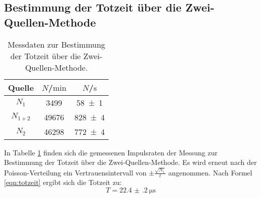 \subsection{Bestimmung der Totzeit über die Zwei-Quellen-Methode}
\begin{table}
  \centering
  \caption{Messdaten zur Bestimmung der Totzeit über die Zwei-Quellen-Methode.}
  \label{tab:tot}
\begin{tabular}{ccc}
  \toprule
Quelle& $N$/$\si{\minute}$& $N$/$\si{\second}$ \\
\midrule
$N_1$ & 3499 & \num{58(1)} \\
$N_{1+2}$ & 49676 & \num{828(4)} \\
$N_{2}$ & 46298 & \num{772(4)} \\
\bottomrule
\end{tabular}
\end{table}
In Tabelle \ref{tab:tot} finden sich die gemessenen Impulsraten der Messung zur Bestimmung der Totzeit über die Zwei-Quellen-Methode.
Es wird erneut nach der Poisson-Verteilung ein Vertrauensintervall von $\pm\frac{\sqrt{N_i}}{t}$ angenommen.
Nach Formel \eqref{eqn:totzeit} ergibt sich die Totzeit zu:
\begin{equation}
  T=\SI{22.4(2)}{\micro\second}
\end{equation}

